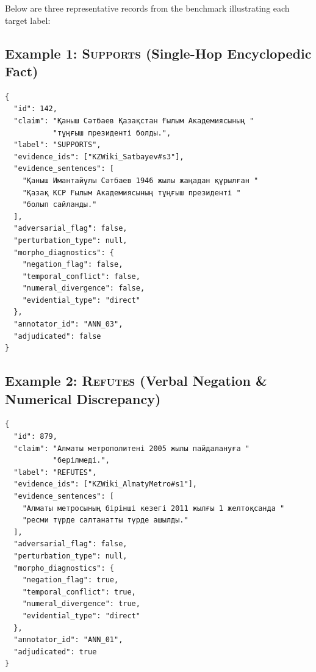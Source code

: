 Below are three representative records from the benchmark illustrating each target label:

\subsection{Example 1: \textsc{Supports} (Single-Hop Encyclopedic Fact)}
\begin{footnotesize}
\begin{verbatim}
{
  "id": 142,
  "claim": "Қаныш Сәтбаев Қазақстан Ғылым Академиясының "
           "тұңғыш президенті болды.",
  "label": "SUPPORTS",
  "evidence_ids": ["KZWiki_Satbayev#s3"],
  "evidence_sentences": [
    "Қаныш Имантайұлы Сәтбаев 1946 жылы жаңадан құрылған "
    "Қазақ КСР Ғылым Академиясының тұңғыш президенті "
    "болып сайланды."
  ],
  "adversarial_flag": false,
  "perturbation_type": null,
  "morpho_diagnostics": {
    "negation_flag": false,
    "temporal_conflict": false,
    "numeral_divergence": false,
    "evidential_type": "direct"
  },
  "annotator_id": "ANN_03",
  "adjudicated": false
}
\end{verbatim}
\end{footnotesize}

\subsection{Example 2: \textsc{Refutes} (Verbal Negation \& Numerical Discrepancy)}
\begin{footnotesize}
\begin{verbatim}
{
  "id": 879,
  "claim": "Алматы метрополитені 2005 жылы пайдалануға "
           "берілмеді.",
  "label": "REFUTES",
  "evidence_ids": ["KZWiki_AlmatyMetro#s1"],
  "evidence_sentences": [
    "Алматы метросының бірінші кезегі 2011 жылғы 1 желтоқсанда "
    "ресми түрде салтанатты түрде ашылды."
  ],
  "adversarial_flag": false,
  "perturbation_type": null,
  "morpho_diagnostics": {
    "negation_flag": true,
    "temporal_conflict": true,
    "numeral_divergence": true,
    "evidential_type": "direct"
  },
  "annotator_id": "ANN_01",
  "adjudicated": true
}
\end{verbatim}
\end{footnotesize}

